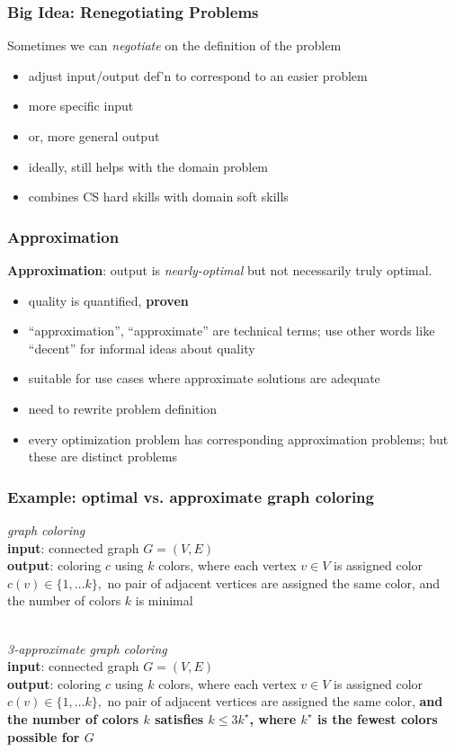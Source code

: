 \documentclass{beamer}
\newcommand{\stanza}{ \\~\ }
\begin{document}
  \begin{frame} \frametitle{Big Idea: Renegotiating Problems}
    Sometimes we can \emph{negotiate} on the definition of the problem
  \begin{itemize}
    \item adjust input/output def'n to correspond to an easier problem
    \item more specific input
    \item or, more general output
    \item ideally, still helps with the domain problem
    \item combines CS hard skills with domain soft skills
  \end{itemize}
  \end{frame}
  
  \begin{frame} \frametitle{Approximation}
  \textbf{Approximation}: output is \emph{nearly-optimal} but not necessarily
  truly optimal.
  \begin{itemize}
    \item quality is quantified, \textbf{proven}
    \item ``approximation'', ``approximate'' are technical terms; use other words
      like ``decent'' for informal ideas about quality
    \item suitable for use cases where approximate solutions are adequate
    \item need to rewrite problem definition
    \item every optimization problem has corresponding approximation problems; but these
      are distinct problems
  \end{itemize}
  \end{frame}
  
  \begin{frame} \frametitle{Example: optimal vs. approximate graph coloring}
  \emph{graph coloring} \\
  \textbf{input}: connected graph $G=(V,E)$ \\
  \textbf{output}: coloring $c$ using $k$ colors, where each vertex $v \in V$ is assigned color
    $c(v) \in \{1, \ldots k\},$ no pair of adjacent vertices are assigned the
    same color, and the number of colors $k$ is minimal
  \stanza
  
  \emph{3-approximate graph coloring} \\
  \textbf{input}: connected graph $G=(V,E)$ \\
  \textbf{output}: coloring $c$ using $k$ colors, where each vertex $v \in V$ is assigned color
    $c(v) \in \{1, \ldots k\},$ no pair of adjacent vertices are assigned the
    same color, \textbf{and the number of colors $k$ satisfies $k \leq 3 k^\star$,
    where $k^\star$ is the fewest colors possible for $G$}
  \end{frame}
  
\end{document}
